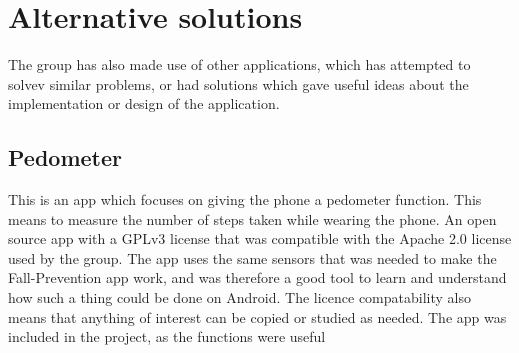 \chapter{Alternative solutions}
The group has also made use of other applications, which has attempted to solvev similar problems, or had solutions which gave useful ideas about the implementation or design of the application. 



\section{Pedometer}
This is an app which focuses on giving the phone a pedometer function. This means to measure the number of steps taken while wearing the phone.
An open source app with a GPLv3 license that was compatible with the Apache 2.0 license used by the group. The app uses the same sensors that was needed to make the Fall-Prevention app work, and was therefore a good tool to learn and understand how such a thing could be done on Android. The licence compatability also means that anything of interest can be copied or studied as needed. The app was included in the project, as the functions were useful


